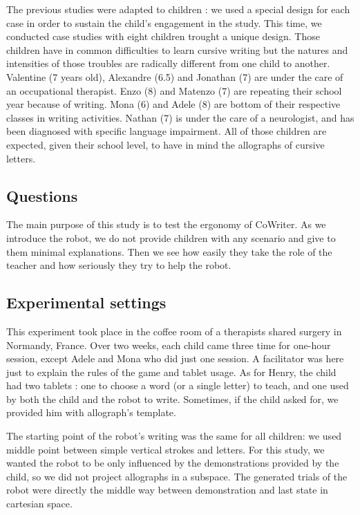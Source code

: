 \documentclass{sig-alternate}
\begin{document}
The previous studies were adapted to children : we used a special
design for each case in order to sustain the child's engagement in the study.
This time, we conducted case studies with eight children trought a unique
design. Those children have in common difficulties to learn
cursive writing but the natures and intensities of those troubles are radically
different from one child to another. Valentine (7 years old), Alexandre (6.5) and
Jonathan (7) are under the care of an
occupational therapist. Enzo (8) and Matenzo (7) are repeating their school year
because of writing. Mona (6) and Adele (8) are bottom of their respective
classes in writing activities. Nathan (7) is under the care of a neurologist, and
has been diagnosed with specific language impairment. All of those children are
expected, given their school level, to have in mind the allographs of
cursive letters. 

\subsection{Questions}

The main purpose of this study is to test the ergonomy of CoWriter. As we
introduce the robot, we do not
provide children with any scenario and give to them minimal explanations. Then
we see how easily they take the role of the teacher and how seriously they try to help the robot.

\subsection{Experimental settings}

This experiment took place in the coffee room of a therapists shared surgery
in Normandy, France. Over two weeks, each child came three time for one-hour
session, except Adele and Mona who did just one session. A facilitator was here
just to explain the rules of the game and tablet usage. As for Henry, the child
had two tablets : one to choose a word (or a single letter) to teach, and one
used by both the child and the robot to write. Sometimes, if the child asked for,
we provided him with allograph's template. 

The starting point of the robot's writing was the same for all children: we
used middle point between simple vertical strokes and letters. For this study,
we wanted the robot to be only influenced by the demonstrations provided by the
child, so we did not project allographs in a subspace. The generated
trials of the robot were directly the middle way between demonstration and
last state in cartesian space. 
\end{document}
